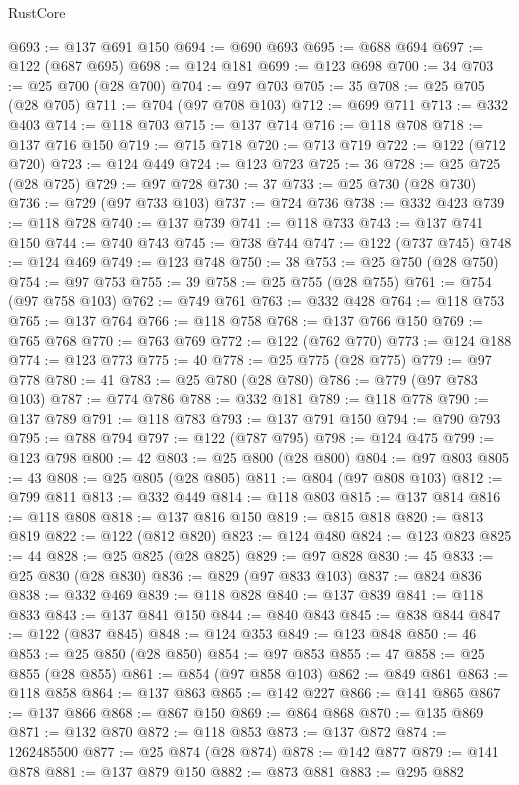 \begin{lexlean}{RustCore}
\begin{coremodule}
@693 := @137 @691 @150
@694 := @690 @693
@695 := @688 @694
@697 := @122 (@687 @695)
@698 := @124 @181
@699 := @123 @698
@700 := 34
@703 := @25 @700 (@28 @700)
@704 := @97 @703
@705 := 35
@708 := @25 @705 (@28 @705)
@711 := @704 (@97 @708 @103)
@712 := @699 @711
@713 := @332 @403
@714 := @118 @703
@715 := @137 @714
@716 := @118 @708
@718 := @137 @716 @150
@719 := @715 @718
@720 := @713 @719
@722 := @122 (@712 @720)
@723 := @124 @449
@724 := @123 @723
@725 := 36
@728 := @25 @725 (@28 @725)
@729 := @97 @728
@730 := 37
@733 := @25 @730 (@28 @730)
@736 := @729 (@97 @733 @103)
@737 := @724 @736
@738 := @332 @423
@739 := @118 @728
@740 := @137 @739
@741 := @118 @733
@743 := @137 @741 @150
@744 := @740 @743
@745 := @738 @744
@747 := @122 (@737 @745)
@748 := @124 @469
@749 := @123 @748
@750 := 38
@753 := @25 @750 (@28 @750)
@754 := @97 @753
@755 := 39
@758 := @25 @755 (@28 @755)
@761 := @754 (@97 @758 @103)
@762 := @749 @761
@763 := @332 @428
@764 := @118 @753
@765 := @137 @764
@766 := @118 @758
@768 := @137 @766 @150
@769 := @765 @768
@770 := @763 @769
@772 := @122 (@762 @770)
@773 := @124 @188
@774 := @123 @773
@775 := 40
@778 := @25 @775 (@28 @775)
@779 := @97 @778
@780 := 41
@783 := @25 @780 (@28 @780)
@786 := @779 (@97 @783 @103)
@787 := @774 @786
@788 := @332 @181
@789 := @118 @778
@790 := @137 @789
@791 := @118 @783
@793 := @137 @791 @150
@794 := @790 @793
@795 := @788 @794
@797 := @122 (@787 @795)
@798 := @124 @475
@799 := @123 @798
@800 := 42
@803 := @25 @800 (@28 @800)
@804 := @97 @803
@805 := 43
@808 := @25 @805 (@28 @805)
@811 := @804 (@97 @808 @103)
@812 := @799 @811
@813 := @332 @449
@814 := @118 @803
@815 := @137 @814
@816 := @118 @808
@818 := @137 @816 @150
@819 := @815 @818
@820 := @813 @819
@822 := @122 (@812 @820)
@823 := @124 @480
@824 := @123 @823
@825 := 44
@828 := @25 @825 (@28 @825)
@829 := @97 @828
@830 := 45
@833 := @25 @830 (@28 @830)
@836 := @829 (@97 @833 @103)
@837 := @824 @836
@838 := @332 @469
@839 := @118 @828
@840 := @137 @839
@841 := @118 @833
@843 := @137 @841 @150
@844 := @840 @843
@845 := @838 @844
@847 := @122 (@837 @845)
@848 := @124 @353
@849 := @123 @848
@850 := 46
@853 := @25 @850 (@28 @850)
@854 := @97 @853
@855 := 47
@858 := @25 @855 (@28 @855)
@861 := @854 (@97 @858 @103)
@862 := @849 @861
@863 := @118 @858
@864 := @137 @863
@865 := @142 @227
@866 := @141 @865
@867 := @137 @866
@868 := @867 @150
@869 := @864 @868
@870 := @135 @869
@871 := @132 @870
@872 := @118 @853
@873 := @137 @872
@874 := 1262485500
@877 := @25 @874 (@28 @874)
@878 := @142 @877
@879 := @141 @878
@881 := @137 @879 @150
@882 := @873 @881
@883 := @295 @882

\end{coremodule}
\end{lexlean}
